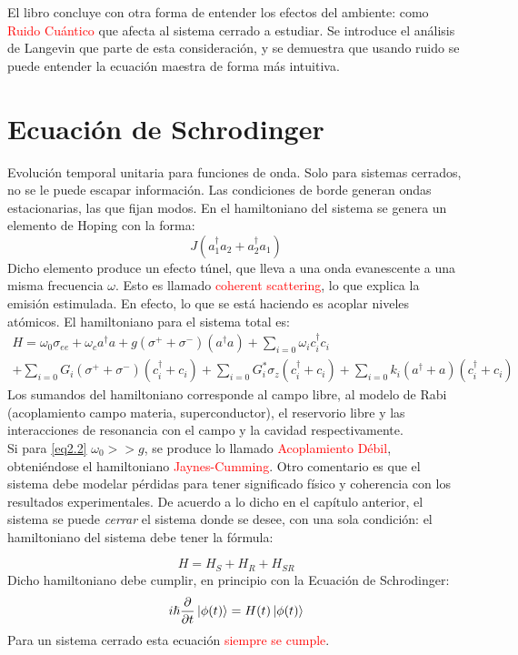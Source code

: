 \documentclass{book}
\begin{document}
El libro concluye con otra forma de entender los efectos del ambiente: como \textcolor{red}{Ruido Cuántico} que afecta al sistema cerrado a estudiar. Se introduce el análisis de Langevin que parte de esta consideración, y se demuestra que usando ruido se puede entender la ecuación maestra de forma más intuitiva.
\chapter{Ecuación de Schrodinger}
 Evolución temporal unitaria para funciones de onda. Solo para sistemas cerrados, no se le puede escapar información. Las condiciones de borde generan ondas estacionarias, las que fijan modos.
En el hamiltoniano del sistema se genera un elemento de Hoping con la forma:
\begin{equation}
    \label{eq2.1} J(a_1^\dag a_2+a_2^\dag a_1) 
\end{equation}
Dicho elemento produce un efecto túnel, que lleva a una onda evanescente a una misma frecuencia $\omega$. Esto es llamado \textcolor{red}{coherent scattering}, lo que explica la emisión estimulada. En efecto, lo que se está haciendo es acoplar niveles atómicos. El hamiltoniano para el sistema total es:
\begin{equation} \begin{aligned}
   \label{eq2.2} H=\omega_0 \sigma_{ee} +\omega_c a^\dag a + g(\sigma^++\sigma^-)(a^\dag a)+\sum_{i=0}\omega_i c_i^\dag c_i\\ +\sum_{i=0}G_i(\sigma^++\sigma^-)(c_i^\dag+c_i)+\sum_{i=0}G_i^* \sigma_z (c_i^\dag +c_i)+\sum_{i=0} k_i(a^\dag+a)(c_i^\dag+c_i)
\end{aligned} \end{equation}
Los sumandos del hamiltoniano corresponde al campo libre, al modelo de Rabi (acoplamiento campo materia, superconductor), el reservorio libre y las interacciones de resonancia con el campo y la cavidad respectivamente. \\

Si para \ref{eq2.2} $\omega_0>>g$, se produce lo llamado \textcolor{red}{Acoplamiento Débil}, obteniéndose el hamiltoniano \textcolor{red}{Jaynes-Cumming}. Otro comentario es que el sistema debe modelar pérdidas para tener significado físico y coherencia con los resultados experimentales. De acuerdo a lo dicho en el capítulo anterior, el sistema se puede \textit{cerrar} el sistema donde se desee, con una sola condición: el hamiltoniano del sistema debe tener la fórmula:

\begin{equation} \label{eq2.3} H=H_S+H_R+H_{SR}\end{equation}
Dicho hamiltoniano debe cumplir, en principio con la Ecuación de Schrodinger:
\begin{equation}\label{eq2.4} i\hslash \frac{\partial}{\partial t} \ket{\phi(t)}=H(t)\ket{\phi(t)}\end{equation}
Para un sistema cerrado esta ecuación \textcolor{red}{siempre se cumple}.
\end{document}
